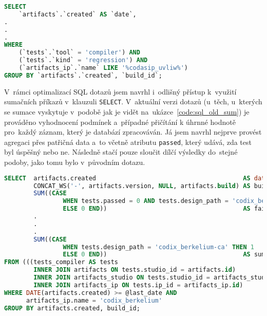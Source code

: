 \lstset{frame=single}
\begin{lstlisting}[language=SQL, basicstyle=\footnotesize\ttfamily, label={code:query_bad_wildcard}, caption=Ukázka chybného použití zástupných znaků \protect\texttt{\%} v~klauzuli \protect\texttt{WHERE} v~referenčním dotazu od~firmy Codasip.]
SELECT
    `artifacts`.`created` AS `date`,
.
.
.
WHERE
	(`tests`.`tool` = 'compiler') AND
	(`tests`.`kind` = 'regression') AND
	(`artifacts_ip`.`name` LIKE '%codasip_uvliw%')
GROUP BY `artifacts`.`created`, `build_id`;
\end{lstlisting}

V~rámci optimalizací SQL dotazů jsem navrhl i~odlišný přístup k~využití sumačních příkazů v~klauzuli \texttt{SELECT}. V~aktuální verzi dotazů (u~těch, u~kterých se sumace vyskytuje v~podobě jak je vidět
na~ukázce~\ref{code:sql_old_sum}) je prováděno vyhodnocení podmínek a~případné přičítání k úhrnné hodnotě pro~každý
záznam, který je databází zpracováván. Já jsem navrhl nejprve provést agregaci přes patřičná data a~to včetně
atributu \texttt{passed}, který udává, zda test byl úspěšný nebo ne. Následně stačí pouze sloučit dílčí výsledky
do~stejné podoby, jako tomu bylo v~původním dotazu.

\lstset{frame=single}
\begin{lstlisting}[language=SQL, basicstyle=\footnotesize\ttfamily, label={code:sql_old_sum}, caption=Kód původního využití příkazu \protect\texttt{SUM} v klauzuli \protect\texttt{SELECT}. Pro~každý záznam jsou vyhodnoceny podmínky a~případně je navýšena úhrnná hodnota.]
SELECT  artifacts.created                                        AS date,
        CONCAT_WS('-', artifacts.version, NULL, artifacts.build) AS build_id,
        SUM((CASE
                WHEN tests.passed = 0 AND tests.design_path = 'codix_berkelium-ia' THEN 1
                ELSE 0 END))                                     AS failed_tests_ia,
        .
        .
        .
        SUM((CASE
                WHEN tests.design_path = 'codix_berkelium-ca' THEN 1
                ELSE 0 END))                                     AS sum_tests_ca
FROM (((tests_compiler AS tests
        INNER JOIN artifacts ON tests.studio_id = artifacts.id)
        INNER JOIN artifacts_studio ON tests.studio_id = artifacts_studio.id)
        INNER JOIN artifacts_ip ON tests.ip_id = artifacts_ip.id)
WHERE DATE(artifacts.created) >= @last_date AND
      artifacts_ip.name = 'codix_berkelium'
GROUP BY artifacts.created, build_id;
\end{lstlisting}


